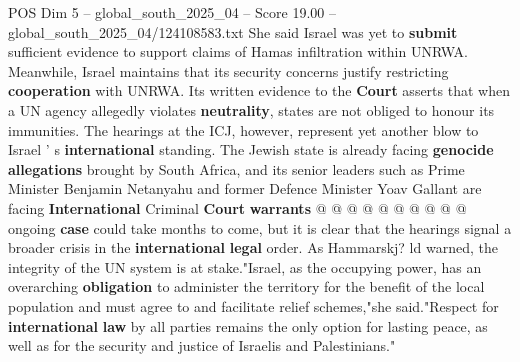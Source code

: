 \begin{textsample}{POS Dim 5 – global\_south\_2025\_04 – Score 19.00 – global\_south\_2025\_04/124108583.txt}
She said Israel was yet to \textbf{submit} sufficient evidence to support claims of Hamas infiltration within UNRWA.
Meanwhile, Israel maintains that its security concerns justify restricting \textbf{cooperation} with UNRWA.
Its written evidence to the \textbf{Court} asserts that when a UN agency allegedly violates \textbf{neutrality}, states are not obliged to honour its immunities.
The hearings at the ICJ, however, represent yet another blow to Israel ' s \textbf{international} standing.
The Jewish state is already facing \textbf{genocide} \textbf{allegations} brought by South Africa, and its senior leaders such as Prime Minister Benjamin Netanyahu and former Defence Minister Yoav Gallant are facing \textbf{International} Criminal \textbf{Court} \textbf{warrants} @ @ @ @ @ @ @ @ @ @ ongoing \textbf{case} could take months to come, but it is clear that the hearings signal a broader crisis in the \textbf{international} \textbf{legal} order.
As Hammarskj? ld warned, the integrity of the UN system is at stake."Israel, as the occupying power, has an overarching \textbf{obligation} to administer the territory for the benefit of the local population and must agree to and facilitate relief schemes,"she said."Respect for \textbf{international} \textbf{law} by all parties remains the only option for lasting peace, as well as for the security and justice of Israelis and Palestinians."

\end{textsample}
